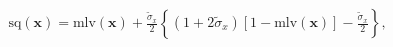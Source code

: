 \documentclass{article}
\begin{document}
\begin{gather}
    \text{sq}(\boldsymbol{x}) = 
    \text{mlv}(\boldsymbol{x}) + 
    \frac{\tilde{\sigma}_{x}}{2}\left\{
        (1 + 2\tilde{\sigma}_{x})[1 - \text{mlv}(\boldsymbol{x})] -
        \frac{\tilde{\sigma}_{x}}{2}
    \right\},\\

\end{gather}
\end{document}
